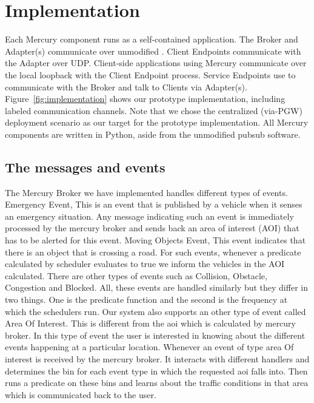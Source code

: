 \section{Implementation}

Each Mercury component runs as a self-contained application. The
Broker and Adapter(s) communicate over unmodified \pubsub. Client
Endpoints communicate with the Adapter over UDP. Client-side
applications using Mercury communicate over the local loopback with
the Client Endpoint process. Service Endpoints use \pubsub to
communicate with the Broker and talk to Clients via
Adapter(s). Figure~\ref{fig:implementation} shows our prototype
implementation, including labeled communication channels. Note that we
chose the centralized (via-PGW) deployment scenario as our target for
the prototype implementation.  All Mercury components are written in Python,
aside from the unmodified \pubsub pubsub software.

\subsection{The messages and events}

The Mercury Broker we have implemented handles different types of events. 
Emergency Event, This is an event that is published by a vehicle when it senses
an emergency situation. Any message indicating such an event is immediately 
processed by the mercury broker and sends back an area of interest (AOI)
that has to be alerted for this event.
Moving Objects Event, This event indicates that there is an object that is 
crossing a road. For such events, whenever a predicate calculated by scheduler 
evaluates to true we inform the vehicles in the AOI calculated.
There are other types of events such as Collision, Obstacle, Congestion and 
Blocked. All, these events are handled similarly but they differ in two things.
One is the predicate function and the second is the frequency at which the 
schedulers run. Our system also supports an other type of event called 
Area Of Interest. This is different from the aoi which is calculated by
mercury broker. In this type of event the user is interested in knowing about 
the different events happening at a particular location. Whenever an event of 
type area Of interest is received by the mercury broker. It interacts with 
different handlers and determines the bin for each event type in which the 
requested aoi falls into. Then runs a predicate on these bins and learns about 
the traffic conditions in that area which is communicated back to the user.


